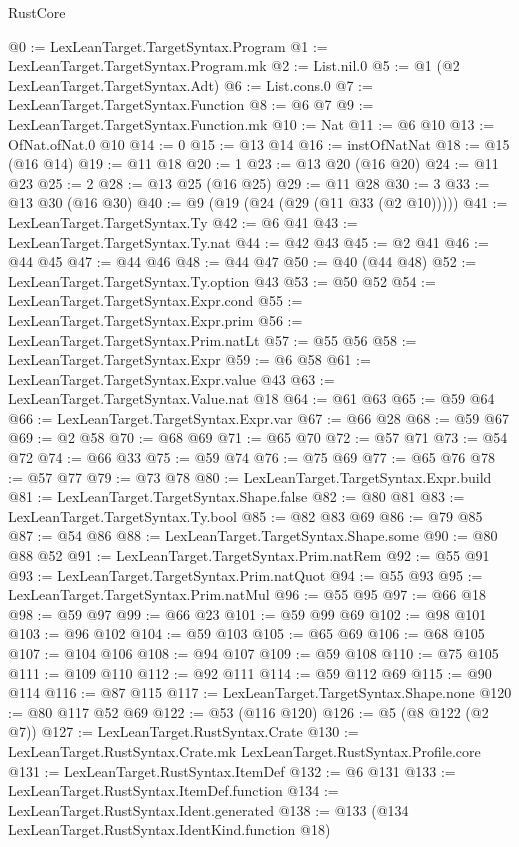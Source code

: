\begin{lexlean}{RustCore}
\begin{coremodule}
@0 := LexLeanTarget.TargetSyntax.Program
@1 := LexLeanTarget.TargetSyntax.Program.mk
@2 := List.nil.{0}
@5 := @1 (@2 LexLeanTarget.TargetSyntax.Adt)
@6 := List.cons.{0}
@7 := LexLeanTarget.TargetSyntax.Function
@8 := @6 @7
@9 := LexLeanTarget.TargetSyntax.Function.mk
@10 := Nat
@11 := @6 @10
@13 := OfNat.ofNat.{0} @10
@14 := 0
@15 := @13 @14
@16 := instOfNatNat
@18 := @15 (@16 @14)
@19 := @11 @18
@20 := 1
@23 := @13 @20 (@16 @20)
@24 := @11 @23
@25 := 2
@28 := @13 @25 (@16 @25)
@29 := @11 @28
@30 := 3
@33 := @13 @30 (@16 @30)
@40 := @9 (@19 (@24 (@29 (@11 @33 (@2 @10)))))
@41 := LexLeanTarget.TargetSyntax.Ty
@42 := @6 @41
@43 := LexLeanTarget.TargetSyntax.Ty.nat
@44 := @42 @43
@45 := @2 @41
@46 := @44 @45
@47 := @44 @46
@48 := @44 @47
@50 := @40 (@44 @48)
@52 := LexLeanTarget.TargetSyntax.Ty.option @43
@53 := @50 @52
@54 := LexLeanTarget.TargetSyntax.Expr.cond
@55 := LexLeanTarget.TargetSyntax.Expr.prim
@56 := LexLeanTarget.TargetSyntax.Prim.natLt
@57 := @55 @56
@58 := LexLeanTarget.TargetSyntax.Expr
@59 := @6 @58
@61 := LexLeanTarget.TargetSyntax.Expr.value @43
@63 := LexLeanTarget.TargetSyntax.Value.nat @18
@64 := @61 @63
@65 := @59 @64
@66 := LexLeanTarget.TargetSyntax.Expr.var
@67 := @66 @28
@68 := @59 @67
@69 := @2 @58
@70 := @68 @69
@71 := @65 @70
@72 := @57 @71
@73 := @54 @72
@74 := @66 @33
@75 := @59 @74
@76 := @75 @69
@77 := @65 @76
@78 := @57 @77
@79 := @73 @78
@80 := LexLeanTarget.TargetSyntax.Expr.build
@81 := LexLeanTarget.TargetSyntax.Shape.false
@82 := @80 @81
@83 := LexLeanTarget.TargetSyntax.Ty.bool
@85 := @82 @83 @69
@86 := @79 @85
@87 := @54 @86
@88 := LexLeanTarget.TargetSyntax.Shape.some
@90 := @80 @88 @52
@91 := LexLeanTarget.TargetSyntax.Prim.natRem
@92 := @55 @91
@93 := LexLeanTarget.TargetSyntax.Prim.natQuot
@94 := @55 @93
@95 := LexLeanTarget.TargetSyntax.Prim.natMul
@96 := @55 @95
@97 := @66 @18
@98 := @59 @97
@99 := @66 @23
@101 := @59 @99 @69
@102 := @98 @101
@103 := @96 @102
@104 := @59 @103
@105 := @65 @69
@106 := @68 @105
@107 := @104 @106
@108 := @94 @107
@109 := @59 @108
@110 := @75 @105
@111 := @109 @110
@112 := @92 @111
@114 := @59 @112 @69
@115 := @90 @114
@116 := @87 @115
@117 := LexLeanTarget.TargetSyntax.Shape.none
@120 := @80 @117 @52 @69
@122 := @53 (@116 @120)
@126 := @5 (@8 @122 (@2 @7))
@127 := LexLeanTarget.RustSyntax.Crate
@130 := LexLeanTarget.RustSyntax.Crate.mk LexLeanTarget.RustSyntax.Profile.core
@131 := LexLeanTarget.RustSyntax.ItemDef
@132 := @6 @131
@133 := LexLeanTarget.RustSyntax.ItemDef.function
@134 := LexLeanTarget.RustSyntax.Ident.generated
@138 := @133 (@134 LexLeanTarget.RustSyntax.IdentKind.function @18)

\end{coremodule}
\end{lexlean}
